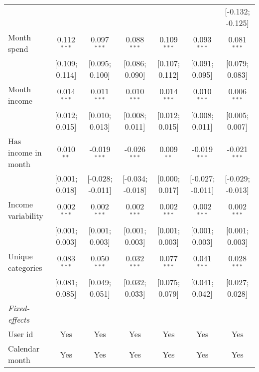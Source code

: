 \begin{table}[htbp]
\begin{threeparttable}[b]
\begin{tabular}{lcccccc}
                                        &                  &                  &                  &                  &                  & [-0.132; -0.125]\\   
         Month spend                    & 0.112$^{***}$    & 0.097$^{***}$    & 0.088$^{***}$    & 0.109$^{***}$    & 0.093$^{***}$    & 0.081$^{***}$\\   
                                        & [0.109; 0.114]   & [0.095; 0.100]   & [0.086; 0.090]   & [0.107; 0.112]   & [0.091; 0.095]   & [0.079; 0.083]\\   
         Month income                   & 0.014$^{***}$    & 0.011$^{***}$    & 0.010$^{***}$    & 0.014$^{***}$    & 0.010$^{***}$    & 0.006$^{***}$\\   
                                        & [0.012; 0.015]   & [0.010; 0.013]   & [0.008; 0.011]   & [0.012; 0.015]   & [0.008; 0.011]   & [0.005; 0.007]\\   
         Has income in month            & 0.010$^{**}$     & -0.019$^{***}$   & -0.026$^{***}$   & 0.009$^{**}$     & -0.019$^{***}$   & -0.021$^{***}$\\   
                                        & [0.001; 0.018]   & [-0.028; -0.011] & [-0.034; -0.018] & [0.000; 0.017]   & [-0.027; -0.011] & [-0.029; -0.013]\\   
         Income variability             & 0.002$^{***}$    & 0.002$^{***}$    & 0.002$^{***}$    & 0.002$^{***}$    & 0.002$^{***}$    & 0.002$^{***}$\\   
                                        & [0.001; 0.003]   & [0.001; 0.003]   & [0.001; 0.003]   & [0.001; 0.003]   & [0.001; 0.003]   & [0.001; 0.003]\\   
         Unique categories              & 0.083$^{***}$    & 0.050$^{***}$    & 0.032$^{***}$    & 0.077$^{***}$    & 0.041$^{***}$    & 0.028$^{***}$\\   
                                        & [0.081; 0.085]   & [0.049; 0.051]   & [0.032; 0.033]   & [0.075; 0.079]   & [0.041; 0.042]   & [0.027; 0.028]\\   
         \midrule
         \emph{Fixed-effects}\\
         User id                        & Yes              & Yes              & Yes              & Yes              & Yes              & Yes\\  
         Calendar month                 & Yes              & Yes              & Yes              & Yes              & Yes              & Yes\\  

\end{tabular}
\end{threeparttable}
\end{table}
